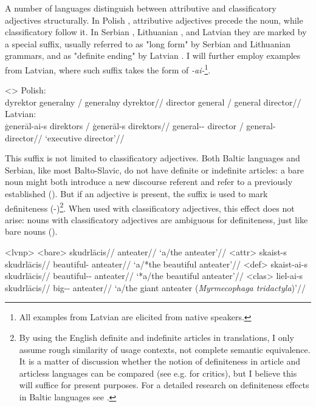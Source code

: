 \documentclass[a4paper, 12pt]{article}
\begin{document}
A number of languages distinguish between attributive and classificatory adjectives structurally. In Polish \parencite{rutkowski2005classificationprojectionpolish}, attributive adjectives precede the noun, while classificatory follow it. In Serbian \parencite{rutkowski2005classificationprojectionpolish}, Lithuanian \parencite{rutkowski2006classifyingadjectivesnoun,holvoet2012semanticmapdefinite}, and Latvian \parencite{holvoet2012semanticmapdefinite} they are marked by a special suffix, usually referred to as "long form" by Serbian and Lithuanian grammars, and as "definite ending" by Latvian \parencite{kalnaca2021latviangrammar}. I will further employ examples from Latvian, where such suffix takes the form of \textit{-ai-}\footnote{All examples from Latvian are elicited from native speakers.}.

\pex<>
    \a Polish:\\
    \begingl
        \gla dyrektor generalny / \ljudge*generalny dyrektor//
        \glb director general / general director//
    \endgl
    \a Latvian:\\
    \begingl
        \gla ģenerāl-ai-s direktors / \ljudge*ģenerāl-s direktors//
        \glb general-\Def{}-\Nom{} director / general-\Nom{} director//
        \glft `executive director'//
    \endgl
\xe

This suffix is not limited to classificatory adjectives. Both Baltic languages and Serbian, like most Balto-Slavic, do not have definite or indefinite articles: a bare noun might both introduce a new discourse referent and refer to a previously established (). But if an adjective is present, the suffix is used to mark definiteness (-)\footnote{By using the English definite and indefinite articles in translations, I only assume rough similarity of usage contexts, not complete semantic equivalence. It is a matter of discussion whether the notion of definiteness in article and articless languages can be compared (see e.g. \cite{simik2021uniquenessmaximalitygerman} for critics), but I believe this will suffice for present purposes. For a detailed research on definiteness effects in Baltic languages see \textcite{holvoet2012semanticmapdefinite}.}. When used with classificatory adjectives, this effect does not arise: nouns with classificatory adjectives are ambiguous for definiteness, just like bare nouns ().

\pex<lvnp>
    \a<bare> \begingl
        \gla skudrlācis//
        \glb anteater//
        \glft `a/the anteater'//
    \endgl
    \a<attr> \begingl
        \gla skaist-s skudrlācis//
        \glb beautiful-\Nom{} anteater//
        \glft `a/*the beautiful anteater'//
    \endgl
    \a<def> \begingl
        \gla skaist-ai-s skudrlācis//
        \glb beautiful-\Def-\Nom{} anteater//
        \glft `*a/the beautiful anteater'//
    \endgl
    \a<clas> \begingl
        \gla liel-ai-s skudrlācis//
        \glb big-\Def-\Nom{} anteater//
        \glft `a/the giant anteater (\textit{Myrmecophaga tridactyla})'//
    \endgl
\xe
\end{document}
